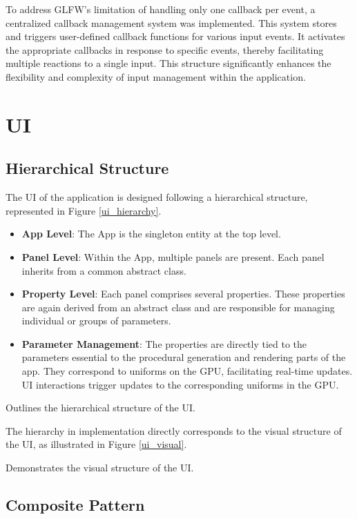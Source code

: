 To address GLFW's limitation of handling only one callback per event, a centralized callback management system was implemented. This system stores and triggers user-defined callback functions for various input events. It activates the appropriate callbacks in response to specific events, thereby facilitating multiple reactions to a single input. This structure significantly enhances the flexibility and complexity of input management within the application.

\section{UI}

\subsection{Hierarchical Structure}

The UI of the application is designed following a hierarchical structure, represented in Figure \ref{ui_hierarchy}.

\begin{itemize}
    \item \textbf{App Level}: The App is the singleton entity at the top level.
    \item \textbf{Panel Level}: Within the App, multiple panels are present. Each panel inherits from a common abstract class.
    \item \textbf{Property Level}: Each panel comprises several properties. These properties are again derived from an abstract class and are responsible for managing individual or groups of parameters.
    \item \textbf{Parameter Management}: The properties are directly tied to the parameters essential to the procedural generation and rendering parts of the app. They correspond to uniforms on the GPU, facilitating real-time updates. UI interactions trigger updates to the corresponding uniforms in the GPU.
\end{itemize}

{Outlines the hierarchical structure of the UI.}

The hierarchy in implementation directly corresponds to the visual structure of the UI, as illustrated in Figure \ref{ui_visual}.

{Demonstrates the visual structure of the UI.}

\subsection{Composite Pattern}

